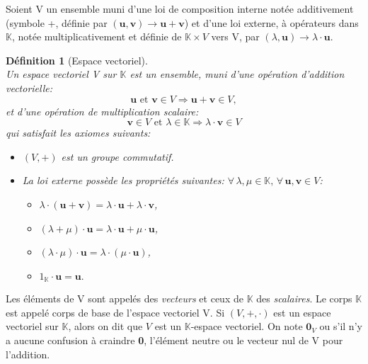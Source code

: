 \documentclass[11pt,a4paper,oneside]{book}
\newtheorem{defi}{Définition}[chapter]
\def\K{\mathbb K}
\def\v{\mathbf v}
\def\u{\mathbf u}
\newcommand{\mbf}[1]{\mathbf{#1}}
\begin{document}
Soient V un ensemble muni d'une loi de composition interne notée additivement (symbole \og +\fg{}, définie par $ (\u,\v)\rightarrow \u+\v $) et d'une loi externe, à opérateurs dans $ \K $, notée multiplicativement et définie de $ \K\times V $ vers V, par $ (\lambda,\u)\rightarrow \lambda\cdot \u. $ 
\begin{defi}[Espace vectoriel]
	\emph{\\}
	Un espace vectoriel V sur $ \K $  est un ensemble, muni d’une opération d’addition vectorielle:
	\begin{equation*}
	\u \text{ et }\v\in V\Rightarrow \u+\v\in V,
	\end{equation*}
	et d’une opération de multiplication scalaire:
		\begin{equation*}
		\v\in V \text{ et }\lambda\in \K\Rightarrow \lambda\cdot \v\in V
	\end{equation*}
	qui satisfait les axiomes suivants:	
	\begin{itemize}
		\item[$ (1) $]
		$ (V,+) $ est un groupe commutatif. 
		\item[$ (2) $]
		La loi externe possède les propriétés suivantes: $ \forall\, \lambda,\mu\in \K,\, \forall \,\u,\v\in V $:
		\begin{itemize}
			\item[$(a)$]
			$ \lambda\cdot(\u+\v)=\lambda\cdot \u+\lambda\cdot \v $,
			\item[$ (b)$]
			$ (\lambda+\mu)\cdot \u=\lambda\cdot \u+\mu\cdot \u $,
			\item[$(c) $]
			$ (\lambda\cdot\mu)\cdot \u=\lambda\cdot(\mu\cdot \u)$,
			\item[$(d) $]
			$ 1_{\K}\cdot \u=\u. $
		\end{itemize}
	
	\end{itemize}
\end{defi}
\par Les éléments de V sont appelés des \textit{vecteurs} et ceux de $\K $ des \textit{scalaires}. Le corps $ \K $ est
appelé  corps de base de l’espace vectoriel V. Si $ (V,+,\cdot) $ est un espace vectoriel sur $ \K $, alors on dit que $V$ est un $ \K $-espace vectoriel. On note $ \mbf{0}_{V} $ ou s'il n'y a aucune confusion  à craindre \textbf{0}, l'élément neutre ou le vecteur nul de V pour l'addition. 
\end{document}
